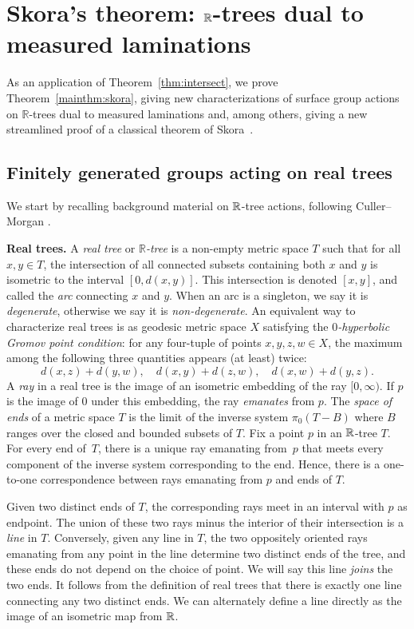 \section{Skora's theorem: \texorpdfstring{$\protect\mathbb{R}$-trees}{R-trees} dual to measured laminations}
\label{sec:skora}

As an application of Theorem~\ref{thm:intersect}, we prove
Theorem~\ref{mainthm:skora},
giving new
characterizations of surface group actions on
$\mathbb{R}$-trees dual to measured laminations and, among others, giving a new streamlined proof of a classical theorem of
 Skora~\cite{Sko90:GeometricAction}.

\subsection{Finitely generated groups acting on real trees}
We start by recalling background material on $\mathbb{R}$-tree actions,
following Culler--Morgan \cite{CM87:GroupActions}.

\textbf{Real trees.}
A \emph{real tree} or \emph{$\mathbb{R}$-tree} is a non-empty metric space $T$ such that for
all $x,y \in T$, the intersection of all connected subsets containing
both $x$ and $y$ is isometric to the interval $[0, d(x, y)]$.  This
intersection is denoted
$[x, y]$, and called the \emph{arc} connecting $x$ and $y$.
When an arc is a singleton, we say it is \emph{degenerate}, otherwise we say it is \emph{non-degenerate}.
An equivalent way to characterize real trees is as geodesic metric
space $X$ satisfying the \emph{$0$-hyperbolic Gromov point condition}:
for any four-tuple of points $x,y,z,w \in X$,
the maximum among the following three quantities appears (at least) twice:
\[
d(x,z) + d(y,w), \quad d(x,y) + d(z,w), \quad d(x,w) + d(y,z).
\]
A \emph{ray} in a real tree is the image of an isometric embedding of
the ray $[0,\infty)$. If $p$ is the image of $0$ under this embedding,
the ray \emph{emanates} from $p$. The \emph{space of ends} of a metric
space $T$ is the limit of the inverse system $\pi_0(T-B)$ where $B$
ranges over the closed and bounded subsets of $T$. Fix a point $p$ in
an $\mathbb{R}$-tree $T$. For every end of~$T$, there is a unique
ray
emanating from~$p$ that meets every component of the inverse system
corresponding to the end.
Hence, there is a one-to-one correspondence between
rays emanating from $p$ and ends of $T$. 

Given two distinct
ends of $T$, the corresponding rays meet in an interval with $p$ as
endpoint. The union of these two rays minus the interior of their
intersection is a \emph{line} in $T$. Conversely, given any line in $T$, the
two oppositely oriented rays emanating from any point in the line
determine two distinct ends of the tree, and these ends do not depend
on the choice of point. We will say this line \emph{joins} the two
ends. It follows from the definition of real trees that there is exactly
one line connecting
any two distinct ends. We can alternately define a line directly as the image of an isometric map from $\mathbb{R}$.


